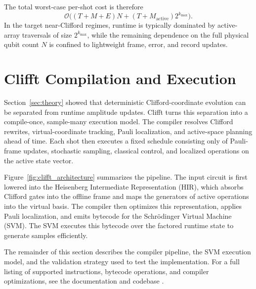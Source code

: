 \documentclass[a4paper, onecolumn, unpublished]{quantumarticle}
\begin{document}
    The total worst-case per-shot cost is therefore
    \begin{equation}
        \label{eq:per_shot_cost}
        \mathcal{O}\bigl((T + M + E)N + (T + M_{\mathrm{active}})2^{k_{\max}}\bigr).
    \end{equation}
    In the target near-Clifford regimes, runtime is typically dominated by active-array traversals of size $2^{k_{\max}}$, while the remaining dependence on the full physical qubit count $N$ is confined to lightweight frame, error, and record updates.


    \section{Clifft Compilation and Execution}
    \label{sec:architecture}

    Section~\ref{sec:theory} showed that deterministic Clifford-coordinate evolution can be separated from runtime amplitude updates. Clifft turns this separation into a compile-once, sample-many execution model. The compiler resolves Clifford rewrites, virtual-coordinate tracking, Pauli localization, and active-space planning ahead of time. Each shot then executes a fixed schedule consisting only of Pauli-frame updates, stochastic sampling, classical control, and localized operations on the active state vector.

    Figure~\ref{fig:clifft_architecture} summarizes the pipeline. The input circuit is first lowered into the Heisenberg Intermediate Representation (HIR), which absorbs Clifford gates into the offline frame and maps the generators of active operations into the virtual basis. The compiler then optimizes this representation, applies Pauli localization, and emits bytecode for the Schr\"odinger Virtual Machine (SVM). The SVM executes this bytecode over the factored runtime state to generate samples efficiently.

    The remainder of this section describes the compiler pipeline, the SVM execution model, and the validation strategy used to test the implementation. For a full listing of supported instructions, bytecode operations, and compiler optimizations, see the documentation and codebase \cite{clifftDocsCode2026}.
\end{document}
